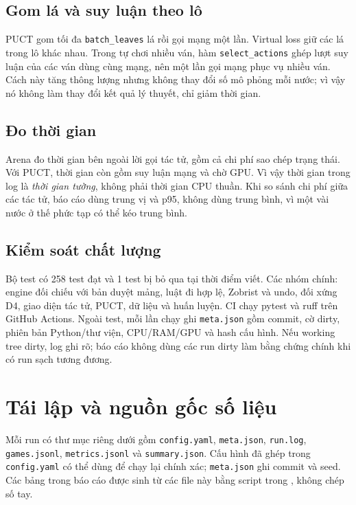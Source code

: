 \subsection{Gom lá và suy luận theo lô}
PUCT gom tối đa \texttt{batch\_leaves} lá rồi gọi mạng một lần. Virtual loss giữ các lá trong
lô khác nhau. Trong tự chơi nhiều ván, hàm \texttt{select\_actions} ghép lượt suy luận của các
ván dùng cùng mạng, nên một lần gọi mạng phục vụ nhiều ván. Cách này tăng thông lượng nhưng
không thay đổi số mô phỏng mỗi nước; vì vậy nó không làm thay đổi kết quả lý thuyết, chỉ giảm
thời gian.

\subsection{Đo thời gian}
Arena đo thời gian bên ngoài lời gọi tác tử, gồm cả chi phí sao chép trạng thái. Với PUCT, thời
gian còn gồm suy luận mạng và chờ GPU. Vì vậy thời gian trong log là \emph{thời gian tường},
không phải thời gian CPU thuần. Khi so sánh chi phí giữa các tác tử, báo cáo dùng trung vị và
p95, không dùng trung bình, vì một vài nước ở thế phức tạp có thể kéo trung bình.

\subsection{Kiểm soát chất lượng}
Bộ test có 258 test đạt và 1 test bị bỏ qua tại thời điểm viết. Các nhóm chính: engine đối chiếu
với bản duyệt mảng, luật đi hợp lệ, Zobrist và undo, đối xứng D4, giao diện tác tử, PUCT, dữ
liệu và huấn luyện. CI chạy pytest và ruff trên GitHub Actions. Ngoài test, mỗi lần chạy ghi
\texttt{meta.json} gồm commit, cờ dirty, phiên bản Python/thư viện, CPU/RAM/GPU và hash cấu
hình. Nếu working tree dirty, log ghi rõ; báo cáo không dùng các run dirty làm bằng chứng chính
khi có run sạch tương đương.

\section{Tái lập và nguồn gốc số liệu}
\label{sec:pp-tai-lap}
Mỗi run có thư mục riêng dưới  gồm \texttt{config.yaml},
\texttt{meta.json}, \texttt{run.log}, \texttt{games.jsonl}, \texttt{metrics.jsonl} và
\texttt{summary.json}. Cấu hình đã ghép trong \texttt{config.yaml} có thể dùng để chạy lại
chính xác; \texttt{meta.json} ghi commit và seed. Các bảng trong báo cáo được sinh từ các file
này bằng script trong , không chép số tay.

